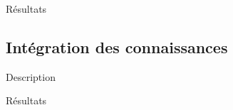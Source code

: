 \documentclass{beamer}
\begin{document}
\begin{frame}{Résultats}

\end{frame}

\subsection{Intégration des connaissances}

\begin{frame}{Description}

\end{frame}

\begin{frame}{Résultats}

\end{frame}
\end{document}
